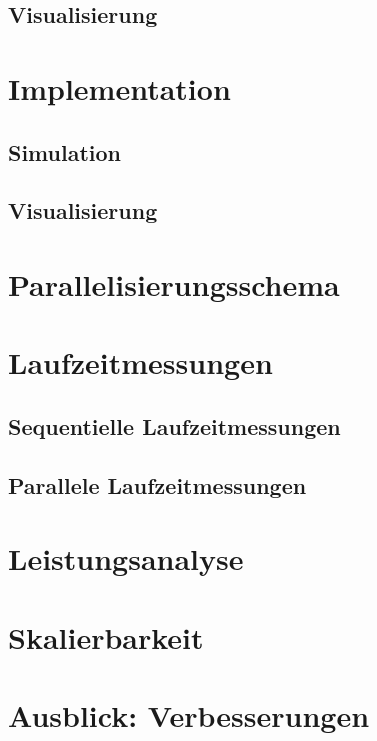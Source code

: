 \documentclass[
	12pt,
	a4paper,
	BCOR10mm,
	DIV14,
	headsepline,
	usegeometry,
]{scrreprt}
\begin{document}
\section{Visualisierung}

\chapter{Implementation}
\section{Simulation}
\section{Visualisierung}

\chapter{Parallelisierungsschema}

\chapter{Laufzeitmessungen}
\section{Sequentielle Laufzeitmessungen}
\section{Parallele Laufzeitmessungen}

\chapter{Leistungsanalyse}

\chapter{Skalierbarkeit}

\chapter{Ausblick: Verbesserungen}
\cite{aarseth}
\cite{kali_11}
\cite{scholarpedia}




\appendix
\appendixpage
\end{document}
